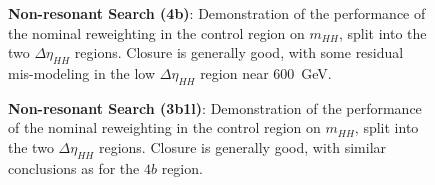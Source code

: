 \begin{figure}[ht]
  \centering
  \caption{\label{fig:nonres-4b-CR} \textbf{Non-resonant Search (4b)}: Demonstration of the performance of the nominal reweighting in the control region on $m_{HH}$, split into the two $\Delta\eta_{HH}$ regions. Closure is generally good, 
  with some residual mis-modeling in the low $\Delta\eta_{HH}$ region near \SI{600}{\GeV}.}
\end{figure}

\begin{figure}[ht]
  \centering
  \caption{\label{fig:nonres-3b1l-CR} \textbf{Non-resonant Search (3b1l)}: Demonstration of the performance of the nominal reweighting in the control region on $m_{HH}$, split into the two $\Delta\eta_{HH}$ regions. Closure is generally good, with similar conclusions as for the $4b$ region.}
\end{figure}

